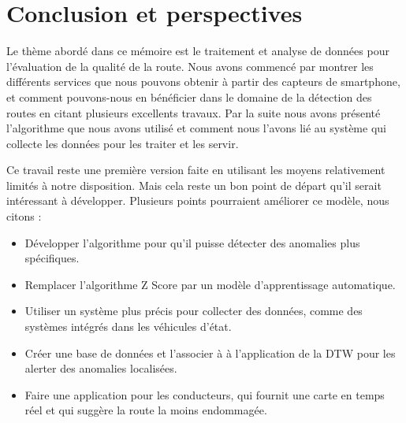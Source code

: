 \chapter{Conclusion et perspectives}
Le thème abordé dans ce mémoire est le traitement et analyse de données pour l'évaluation de la qualité de la route.  Nous avons commencé par montrer les différents services que nous pouvons obtenir à partir des capteurs de smartphone, et comment pouvons-nous en bénéficier dans le domaine de la détection des routes en citant plusieurs excellents travaux. Par la suite nous avons présenté l'algorithme que nous avons utilisé et comment nous l'avons lié au système qui collecte les données pour les traiter et les servir.

Ce travail reste une première version faite en utilisant les moyens relativement limités à notre disposition. Mais cela reste un bon point de départ qu’il serait intéressant à développer. Plusieurs points pourraient améliorer ce modèle, nous citons : 

\begin{itemize}
    \item Développer l'algorithme pour qu'il puisse détecter des anomalies plus spécifiques.
    \item Remplacer l'algorithme Z Score par un modèle d'apprentissage automatique.
    \item Utiliser un système plus précis pour collecter des données, comme des systèmes intégrés dans les véhicules d'état.
    \item Créer une base de données et l'associer à à l'application de la DTW pour les alerter des anomalies localisées.
    \item Faire une application pour les conducteurs, qui fournit une carte en temps réel et qui suggère la route la moins endommagée.
\end{itemize}



